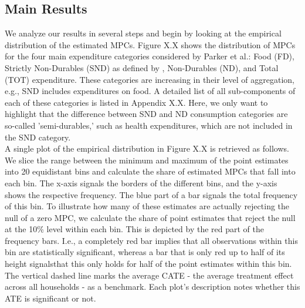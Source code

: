 \subsection{Main Results}
We analyze our results in several steps and begin by looking at the empirical distribution of the estimated MPCs. Figure X.X shows the distribution of MPCs for the four main expenditure categories considered by Parker et al.: Food (FD), Strictly Non-Durables (SND) as defined by \cite{lusardi_1996}, Non-Durables (ND), and Total (TOT) expenditure. These categories are increasing in their level of aggregation, e.g., SND includes expenditures on food. A detailed list of all sub-components of each of these categories is listed in Appendix X.X. Here, we only want to highlight that the difference between SND and ND consumption categories are so-called 'semi-durables,' such as health expenditures, which are not included in the SND category. \\
A single plot of the empirical distribution in Figure X.X is retrieved as follows. We slice the range between the minimum and maximum of the point estimates into 20 equidistant bins and calculate the share of estimated MPCs that fall into each bin. The x-axis signals the borders of the different bins, and the y-axis shows the respective frequency. The blue part of a bar signals the total frequency of this bin. To illustrate how many of these estimates are actually rejecting the null of a zero MPC, we calculate the share of point estimates that reject the null at the 10\% level within each bin. This is depicted by the red part of the frequency bars. I.e., a completely red bar implies that all observations within this bin are statistically significant, whereas a bar that is only red up to half of its height signalsthat this only holds for half of the point estimates within this bin. The vertical dashed line marks the average CATE - the average treatment effect across all households - as a benchmark. Each plot's description notes whether this ATE is significant or not. \\ 

